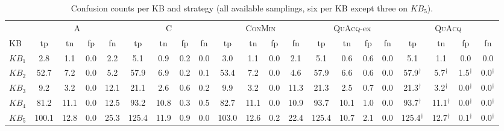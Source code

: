 \begin{table}[t]
\centering
\small
\setlength{\tabcolsep}{4pt}
\begin{tabular}{lcccccccccccccccccccc}
\toprule
 & \multicolumn{4}{c}{A} & \multicolumn{4}{c}{C} & \multicolumn{4}{c}{\textsc{ConMin}} & \multicolumn{4}{c}{\textsc{QuAcq}-ex} & \multicolumn{4}{c}{\textsc{QuAcq}} \tabularnewline
\cmidrule(lr){2-5} \cmidrule(lr){6-9} \cmidrule(lr){10-13} \cmidrule(lr){14-17} \cmidrule(lr){18-21}
KB & tp & tn & fp & fn & tp & tn & fp & fn & tp & tn & fp & fn & tp & tn & fp & fn & tp & tn & fp & fn \tabularnewline
\midrule
$KB_{1}$ & 2.8 & 1.1 & 0.0 & 2.2 & 5.1 & 0.9 & 0.2 & 0.0 & 3.0 & 1.1 & 0.0 & 2.1 & 5.1 & 0.6 & 0.6 & 0.0 & 5.1 & 1.1 & 0.0 & 0.0 \tabularnewline
$KB_{2}$ & 52.7 & 7.2 & 0.0 & 5.2 & 57.9 & 6.9 & 0.2 & 0.1 & 53.4 & 7.2 & 0.0 & 4.6 & 57.9 & 6.6 & 0.6 & 0.0 & 57.9$^{\dagger}$ & 5.7$^{\dagger}$ & 1.5$^{\dagger}$ & 0.0$^{\dagger}$ \tabularnewline
$KB_{3}$ & 9.2 & 3.2 & 0.0 & 12.1 & 21.1 & 2.6 & 0.6 & 0.2 & 9.9 & 3.2 & 0.0 & 11.3 & 21.3 & 2.5 & 0.7 & 0.0 & 21.3$^{\dagger}$ & 3.2$^{\dagger}$ & 0.0$^{\dagger}$ & 0.0$^{\dagger}$ \tabularnewline
$KB_{4}$ & 81.2 & 11.1 & 0.0 & 12.5 & 93.2 & 10.8 & 0.3 & 0.5 & 82.7 & 11.1 & 0.0 & 10.9 & 93.7 & 10.1 & 1.0 & 0.0 & 93.7$^{\dagger}$ & 11.1$^{\dagger}$ & 0.0$^{\dagger}$ & 0.0$^{\dagger}$ \tabularnewline
$KB_{5}$ & 100.1 & 12.8 & 0.0 & 25.3 & 125.4 & 11.9 & 0.9 & 0.0 & 103.0 & 12.6 & 0.2 & 22.4 & 125.4 & 10.7 & 2.1 & 0.0 & 125.4$^{\dagger}$ & 12.7$^{\dagger}$ & 0.1$^{\dagger}$ & 0.0$^{\dagger}$ \tabularnewline
\bottomrule
\end{tabular}
\caption{Confusion counts per KB and strategy (all available samplings, six per KB except three on $KB_{5}$).}
\label{tab:app-confusion}
\end{table}
